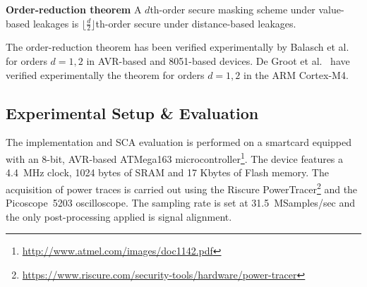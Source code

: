 \vspace{0.15cm}
\noindent\textbf{Order-reduction theorem} A $d$th-order secure masking scheme under value-based leakages is $\lfloor \frac{d}{2} \rfloor$th-order secure under distance-based leakages.
\vspace{0.15cm}

The order-reduction theorem has been verified experimentally by 
Balasch et al.~\cite{DBLP:conf/cardis/BalaschGGRS14} 
for orders $d=1,2$ in AVR-based and 8051-based devices. 
De Groot et al.~\cite{DBLP:journals/iacr/GrootPPSB16} have verified experimentally 
the theorem for orders $d=1,2$ in the ARM Cortex-M4.

\subsection{Experimental Setup \& Evaluation}
The implementation and SCA evaluation is performed on a smartcard equipped with an 8-bit, AVR-based ATMega163 microcontroller\footnote{\url{http://www.atmel.com/images/doc1142.pdf}}. 
The device features a 4.4~MHz clock, 1024 bytes of SRAM and 17 Kbytes of Flash memory. 
The acquisition of power traces is carried out using the Riscure PowerTracer\footnote{\url{https://www.riscure.com/security-tools/hardware/power-tracer}} and the Picoscope~5203 oscilloscope. The sampling rate is set at 31.5~MSamples/sec and the only post-processing applied is signal alignment.

